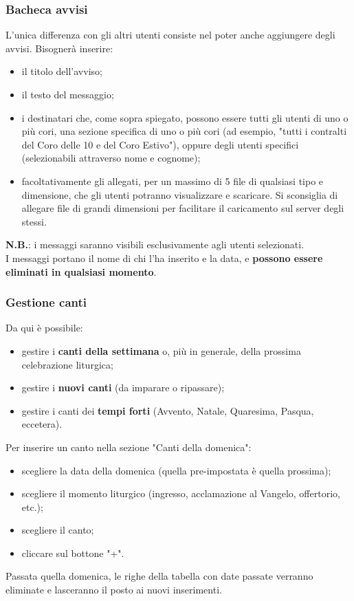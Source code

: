 \documentclass[a4paper,12pt]{article}
\begin{document}
	\subsubsection{Bacheca avvisi}
	L'unica differenza con gli altri utenti consiste nel poter anche aggiungere degli avvisi. Bisognerà inserire:
	\begin{itemize}
		\item il titolo dell'avviso;
		\item il testo del messaggio;
		\item i destinatari che, come sopra spiegato, possono essere tutti gli utenti di uno o più cori, una sezione specifica di uno o più cori (ad esempio, "tutti i contralti del Coro delle 10 e del Coro Estivo"), oppure degli utenti specifici (selezionabili attraverso nome e cognome);
		\item facoltativamente gli allegati, per un massimo di 5 file di qualsiasi tipo e dimensione, che gli utenti potranno visualizzare e scaricare. Si sconsiglia di allegare file di grandi dimensioni per facilitare il caricamento sul server degli stessi.
	\end{itemize}
	\textbf{N.B.}: i messaggi saranno visibili esclusivamente agli utenti selezionati.\\
	I messaggi portano il nome di chi l'ha inserito e la data, e \textbf{possono essere eliminati in qualsiasi momento}.
	
	\subsubsection{Gestione canti}
	Da qui è possibile:
	\begin{itemize}
		\item gestire i \textbf{canti della settimana} o, più in generale, della prossima celebrazione liturgica;
		\item gestire i \textbf{nuovi canti} (da imparare o ripassare);
		\item gestire i canti dei \textbf{tempi forti} (Avvento, Natale, Quaresima, Pasqua, eccetera).
	\end{itemize}
	
	Per inserire un canto nella sezione "Canti della domenica":
	\begin{itemize}
		\item scegliere la data della domenica (quella pre-impostata è quella prossima);
		\item scegliere il momento liturgico (ingresso, acclamazione al Vangelo, offertorio, etc.);
		\item scegliere il canto;
		\item cliccare sul bottone "+".
	\end{itemize}
	Passata quella domenica, le righe della tabella con date passate verranno eliminate e lasceranno il posto ai nuovi inserimenti.\\
	
\end{document}
